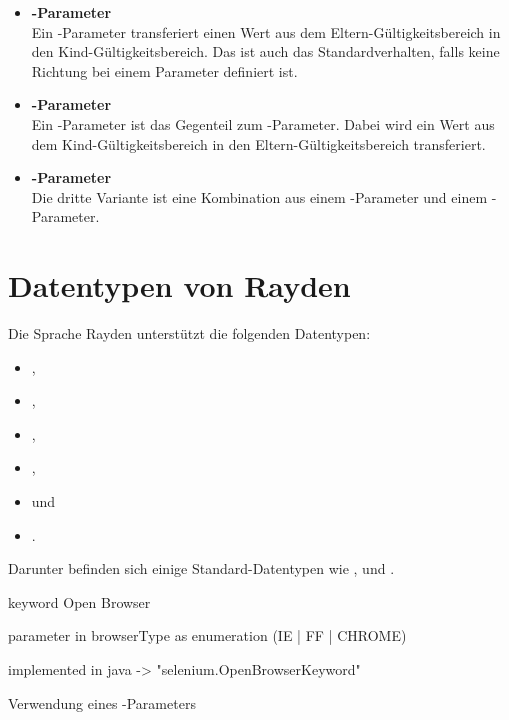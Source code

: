 \begin{itemize}
\item \textbf{-Parameter}\\
Ein -Parameter transferiert einen Wert aus dem Eltern-Gültigkeitsbereich in den Kind-Gültigkeitsbereich. Das ist auch das Standardverhalten, falls keine Richtung bei einem Parameter definiert ist.\\

\item \textbf{-Parameter}\\
Ein -Parameter ist das Gegenteil zum -Parameter. Dabei wird ein Wert aus dem Kind-Gültigkeitsbereich in den Eltern-Gültigkeitsbereich transferiert. \\

\item \textbf{-Parameter}\\
Die dritte Variante ist eine Kombination aus einem -Parameter und einem -Parameter.\\
\end{itemize}

\section{Datentypen von Rayden}

Die Sprache Rayden unterstützt die folgenden Datentypen:

\begin{itemize}
\item {},
\item {},
\item {},
\item {},
\item {} und
\item {}.
\end{itemize}

\SuperPar
Darunter befinden sich einige Standard-Datentypen wie ,  und . 

\begin{program}
\begin{JavaCode}
keyword Open Browser { 
	parameter in browserType as enumeration (IE | FF | CHROME)

	implemented in java -> "selenium.OpenBrowserKeyword"
}
\end{JavaCode}
\caption{Verwendung eines -Parameters}
\label{prog:enum}
\end{program}

